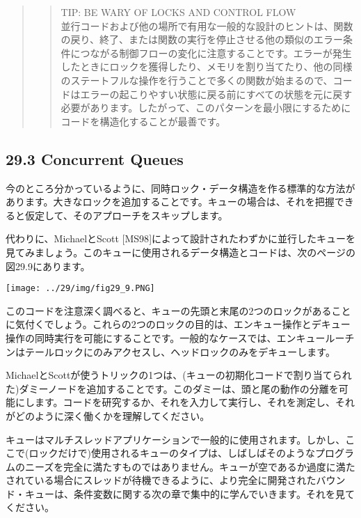 \begin{quote}
\begin{quote}
TIP: BE WARY OF LOCKS AND CONTROL FLOW\\
並行コードおよび他の場所で有用な一般的な設計のヒントは、関数の戻り、終了、または関数の実行を停止させる他の類似のエラー条件につながる制御フローの変化に注意することです。エラーが発生したときにロックを獲得したり、メモリを割り当てたり、他の同様のステートフルな操作を行うことで多くの関数が始まるので、コードはエラーの起こりやすい状態に戻る前にすべての状態を元に戻す必要があります。したがって、このパターンを最小限にするためにコードを構造化することが最善です。
\end{quote}
\end{quote}

\hypertarget{concurrent-queues}{%
\subsection*{29.3 Concurrent Queues}\label{concurrent-queues}}

今のところ分かっているように、同時ロック・データ構造を作る標準的な方法があります。大きなロックを追加することです。キューの場合は、それを把握できると仮定して、そのアプローチをスキップします。

代わりに、MichaelとScott
{[}MS98{]}によって設計されたわずかに並行したキューを見てみましょう。このキューに使用されるデータ構造とコードは、次のページの図29.9にあります。

\texttt{[image: ../29/img/fig29\_9.PNG]}

このコードを注意深く調べると、キューの先頭と末尾の2つのロックがあることに気付くでしょう。これらの2つのロックの目的は、エンキュー操作とデキュー操作の同時実行を可能にすることです。一般的なケースでは、エンキュールーチンはテールロックにのみアクセスし、ヘッドロックのみをデキューします。

MichaelとScottが使うトリックの1つは、(キューの初期化コードで割り当てられた)ダミーノードを追加することです。このダミーは、頭と尾の動作の分離を可能にします。コードを研究するか、それを入力して実行し、それを測定し、それがどのように深く働くかを理解してください。

キューはマルチスレッドアプリケーションで一般的に使用されます。しかし、ここで(ロックだけで)使用されるキューのタイプは、しばしばそのようなプログラムのニーズを完全に満たすものではありません。キューが空であるか過度に満たされている場合にスレッドが待機できるように、より完全に開発されたバウンド・キューは、条件変数に関する次の章で集中的に学んでいきます。それを見てください。

